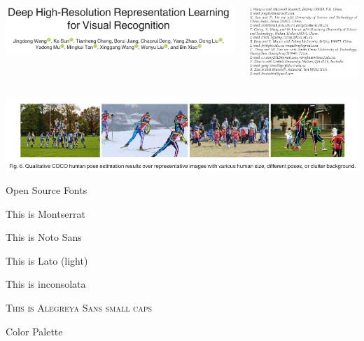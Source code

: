\begin{frame}
   \centering
   \begin{columns}
      \begin{column}{0.65\linewidth}
         \includegraphics[width=\columnwidth]{images/hrnet-title.png}
      \end{column}
      \begin{column}{0.35\linewidth}
         \includegraphics[width=\columnwidth]{images/hrnet-authors.png}
      \end{column}
   \end{columns}
   \vfill
   \includegraphics[width=\linewidth]{images/hrnet-human-pose.png}
\end{frame}

\begin{frame}{Open Source Fonts}
 \begin{fullpageitemize}
  \item {\montserratfont This is Montserrat}
  \item {\notosansfont This is Noto Sans}
  \item {\latolightfont This is Lato (light)}
  \item {\inconsolatafont This is inconsolata}
  \item \textsc{This is Alegreya Sans small caps}
 \end{fullpageitemize}
\end{frame}
\begin{frame}{Color Palette}
 \begin{center}
  \crule[colordgray] \crule[colorhgray] \crule[colorblue] \crule[colorgreen] \crule[colororange]
 \end{center}
\end{frame}


